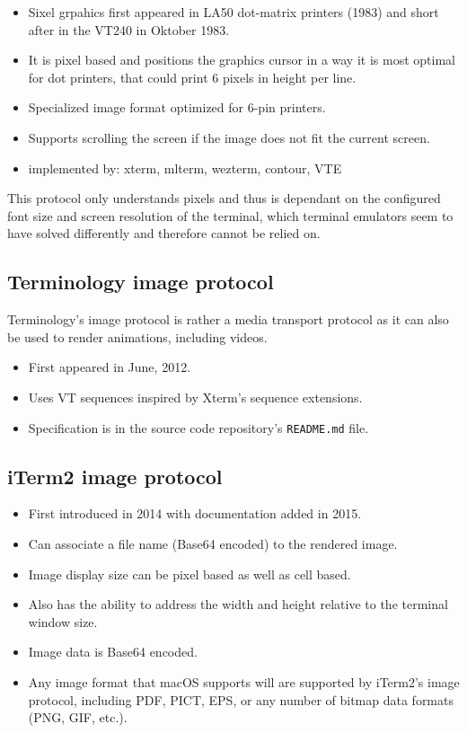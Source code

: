 \documentclass[a4paper]{article}
\begin{document}
\begin{itemize}
    \item Sixel grpahics first appeared in LA50 dot-matrix printers (1983) and short after in the VT240 in Oktober 1983.
    \item It is pixel based and positions the graphics cursor in a way it is most optimal for dot printers,
        that could print 6 pixels in height per line.
    \item Specialized image format optimized for 6-pin printers.
    \item Supports scrolling the screen if the image does not fit the current screen.
    \item implemented by: xterm, mlterm, wezterm, contour, VTE
\end{itemize}

This protocol only understands pixels and thus is dependant on the
configured font size and screen resolution of the terminal, which
terminal emulators seem to have solved differently and therefore cannot
be relied on.

\subsection{Terminology image protocol}

Terminology's image protocol is rather a media transport protocol as it
can also be used to render animations, including videos.

\begin{itemize}
    \item First appeared in June, 2012.
    \item Uses VT sequences inspired by Xterm's sequence extensions.
    \item Specification is in the source code repository's \texttt{README.md} file.
\end{itemize}

\subsection{iTerm2 image protocol}

\begin{itemize}
    \item First introduced in 2014 with documentation added in 2015.
    \item Can associate a file name (Base64 encoded) to the rendered image.
    \item Image display size can be pixel based as well as cell based.
    \item Also has the ability to address the width and height relative to the terminal window size.
    \item Image data is Base64 encoded.
    \item Any image format that macOS supports will are supported by iTerm2's image protocol,
        including PDF, PICT, EPS, or any number of bitmap data formats (PNG, GIF, etc.).
\end{itemize}
\end{document}
